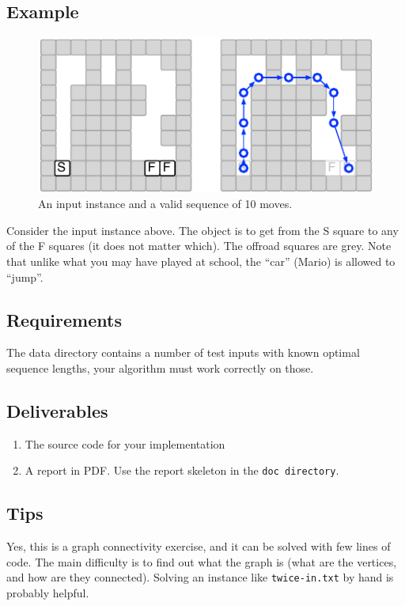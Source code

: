 \documentclass{tufte-handout}
\begin{document}
\subsection{Example}

\begin{figure}
  \includegraphics{racetrack.pdf}
  \caption{An input instance and a valid sequence of 10 moves.}
\end{figure}

Consider the input instance above.
The object is to get from the S square to any of the F squares (it does not matter which).
The offroad squares are grey.
Note that unlike what you may have played at school, the ``car'' (Mario) is allowed to ``jump''.

\subsection{Requirements}

The data directory contains a number of test inputs with known optimal sequence lengths, your algorithm must work correctly on those.

\subsection{Deliverables}

\begin{enumerate}
  \item The source code for your implementation
  \item A report in PDF.
  Use the report skeleton in the {\tt doc directory}.
  \end{enumerate}

\subsection{Tips}

Yes, this is a graph connectivity exercise, and it can be solved with few lines of code.
The main difficulty is to find out what the graph is (what are the vertices, and how are they connected).
Solving an instance like {\tt twice-in.txt} by hand is probably helpful.
\end{document}
